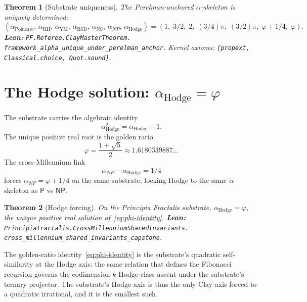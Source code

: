 \documentclass[11pt,a4paper]{article}
\theoremstyle{plain}
\newtheorem{theorem}{Theorem}[section]
\theoremstyle{definition}
\begin{document}
\begin{theorem}[Substrate uniqueness]
\label{thm:substrate}
The Perelman-anchored $\alpha$-skeleton is uniquely determined:
\[
(\alpha_{\mathrm{Poincar\acute e}},\,
\alpha_{\mathrm{RH}},\,
\alpha_{\mathrm{YM}},\,
\alpha_{\mathrm{BSD}},\,
\alpha_{\mathrm{NS}},\,
\alpha_{NP},\,
\alpha_{\mathrm{Hodge}}) =
(1,\;3/2,\;2,\;(3/4)\pi,\;(3/2)\pi,\;\varphi + 1/4,\;\varphi).
\]
\textbf{Lean:}
\texttt{PF.Referee.ClayMasterTheorem.\\
framework\_alpha\_unique\_under\_perelman\_anchor}.
Kernel axioms: \texttt{[propext, Classical.choice, Quot.sound]}.
\end{theorem}

\section{The Hodge solution: $\alpha_{\mathrm{Hodge}} = \varphi$}

The substrate carries the algebraic identity
\begin{equation}
\label{eq:phi-identity}
\alpha_{\mathrm{Hodge}}^{2} = \alpha_{\mathrm{Hodge}} + 1.
\end{equation}
The unique positive real root is the golden ratio
\[
\varphi = \frac{1 + \sqrt{5}}{2} \approx 1.6180339887\ldots
\]
The cross-Millennium link
\begin{equation}
\label{eq:np-hodge-link}
\alpha_{NP} - \alpha_{\mathrm{Hodge}} = 1/4
\end{equation}
forces $\alpha_{NP} = \varphi + 1/4$ on the same substrate, locking
Hodge to the same $\alpha$-skeleton as $\mathsf{P}$ vs $\mathsf{NP}$.

\begin{theorem}[Hodge forcing]
\label{thm:hodge-forcing}
On the Principia Fractalis substrate,
$\alpha_{\mathrm{Hodge}} = \varphi$, the unique positive real
solution of~\eqref{eq:phi-identity}.
\textbf{Lean:}
\texttt{PrincipiaTractalis.CrossMillenniumSharedInvariants.\\
cross\_millennium\_shared\_invariants\_capstone}.
\end{theorem}

The golden-ratio identity~\eqref{eq:phi-identity} is the
substrate's quadratic self-similarity at the Hodge axis: the same
relation that defines the Fibonacci recursion governs the
codimension-$k$ Hodge-class ascent under the substrate's ternary
projector. The substrate's Hodge axis is thus the only Clay axis
forced to a quadratic irrational, and it is the smallest such.
\end{document}

